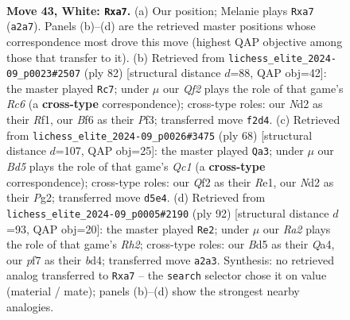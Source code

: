 \documentclass[11pt]{article}
\begin{document}
\clearpage

\begin{figure}[p]\centering
\begin{subfigure}{0.46\textwidth}\centering
\resizebox{\linewidth}{!}{%
\newchessgame
\chessboard[
  setfen={1rb2r2/p1q2p1k/1p3Bp1/3B4/7P/1P6/R1PN1Q2/R5K1 w - - 0 43},
  showmover=false,
  pgfstyle=straightmove, color=movearrow, markmove={a2-a7}
]}
\caption{}
\end{subfigure}\hfill
\begin{subfigure}{0.46\textwidth}\centering
\resizebox{\linewidth}{!}{%
\newchessgame
\chessboard[
  setfen={4r3/5p1k/2R3p1/3rpq1p/1B3b2/P4P2/6QP/5R1K w - - 7 42},
  showmover=false,
  pgfstyle=straightmove, color=movearrow, markmove={c6-c7}
]}
\caption{}
\end{subfigure}
\\[4pt]
\begin{subfigure}{0.46\textwidth}\centering
\resizebox{\linewidth}{!}{%
\newchessgame
\chessboard[
  setfen={2r4k/6p1/5q1p/1p2pp2/2bp4/5B2/2P2PPP/2Q1R1K1 w - - 0 35},
  showmover=false,
  pgfstyle=straightmove, color=movearrow, markmove={c1-a3}
]}
\caption{}
\end{subfigure}\hfill
\begin{subfigure}{0.46\textwidth}\centering
\resizebox{\linewidth}{!}{%
\newchessgame
\chessboard[
  setfen={1k3r2/1bppq3/1p1r4/5B1R/Q2b2P1/P3p3/1P5R/1K6 w - - 2 47},
  showmover=false,
  pgfstyle=straightmove, color=movearrow, markmove={h2-e2}
]}
\caption{}
\end{subfigure}
\caption{\textbf{Move 43, White: \texttt{Rxa7}.} (a) Our position; Melanie plays \texttt{Rxa7} (\texttt{a2a7}). Panels (b)--(d) are the retrieved master positions whose correspondence most drove this move (highest QAP objective among those that transfer to it). (b) Retrieved from \texttt{lichess\_elite\_2024-09\_p0023\#2507} (ply 82) [structural distance $d$=88, QAP obj=42]: the master played \texttt{Rc7}; under $\mu$ our \emph{Qf2} plays the role of that game's \emph{Rc6} (a \textbf{cross-type} correspondence); cross-type roles: our \emph{N}d2 as their \emph{R}f1, our \emph{B}f6 as their \emph{P}f3; transferred move \texttt{f2d4}. (c) Retrieved from \texttt{lichess\_elite\_2024-09\_p0026\#3475} (ply 68) [structural distance $d$=107, QAP obj=25]: the master played \texttt{Qa3}; under $\mu$ our \emph{Bd5} plays the role of that game's \emph{Qc1} (a \textbf{cross-type} correspondence); cross-type roles: our \emph{Q}f2 as their \emph{R}e1, our \emph{N}d2 as their \emph{P}g2; transferred move \texttt{d5e4}. (d) Retrieved from \texttt{lichess\_elite\_2024-09\_p0005\#2190} (ply 92) [structural distance $d$=93, QAP obj=20]: the master played \texttt{Re2}; under $\mu$ our \emph{Ra2} plays the role of that game's \emph{Rh2}; cross-type roles: our \emph{B}d5 as their \emph{Q}a4, our \emph{p}f7 as their \emph{b}d4; transferred move \texttt{a2a3}. Synthesis: no retrieved analog transferred to \texttt{Rxa7} -- the \texttt{search} selector chose it on value (material / mate); panels (b)--(d) show the strongest nearby analogies.}
\label{fig:thought-m84}
\end{figure}
\end{document}
